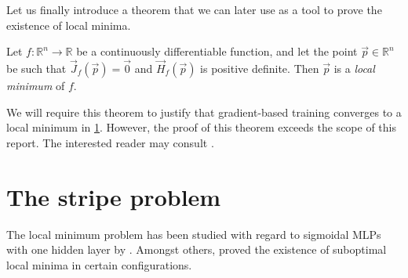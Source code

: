 Let us finally introduce a theorem that we can later use as a tool to prove the existence of local minima.
\begin{theorem}
    Let $f: \mathbb{R}^n \rightarrow \mathbb{R}$ be a continuously differentiable function, and let the point
    $\vec{p} \in \mathbb{R}^n$
    be such that
    $\vec{J}_f(\vec{p}) = \vec{0}$
    and
    $\vec{H}_f(\vec{p})$ is positive definite.
    Then $\vec{p}$ is a \textit{local minimum} of $f$.
\end{theorem}
We will require this theorem to justify that gradient-based training converges to a local minimum in \ref{sec:stripe_problem}.
However, the proof of this theorem exceeds the scope of this report.
The interested reader may consult \textcite[190]{loomis1990}.

\section{The stripe problem}
\label{sec:stripe_problem}
The local minimum problem has been studied with regard to sigmoidal MLPs with one hidden layer by \textcite{blum1989}.
Amongst others, \citeauthor{blum1989} proved the existence of suboptimal local minima in certain configurations. 

